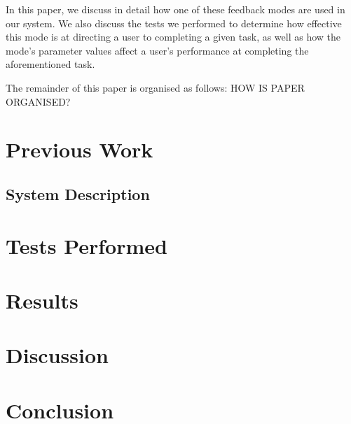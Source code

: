 \documentclass[format=sigconf, review=true, screen=true, anonymous=true]{acmart}
\begin{document}
In this paper, we discuss in detail how one of these feedback modes are used in our system. We also discuss the tests we performed to determine how effective this mode is at directing a user to completing a given task, as well as how the mode's parameter values affect a user's performance at completing the aforementioned task. 

The remainder of this paper is organised as follows: HOW IS PAPER ORGANISED?

\section{Previous Work}

\subsection{System Description}

\section{Tests Performed}

\section{Results}

\section{Discussion}

\section{Conclusion}



\end{document}
